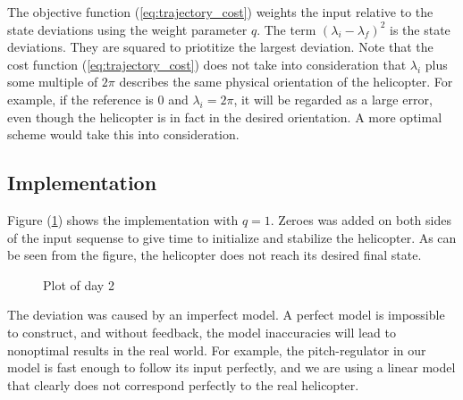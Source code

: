 The objective function (\ref{eq:trajectory_cost}) weights%
 the input relative to the state deviations using the weight parameter $q$. The term $(\lambda_i - \lambda_f)^2$ is the state deviations. They are squared to priotitize the largest deviation. Note that the cost function (\ref{eq:trajectory_cost}) does not take into consideration that $\lambda_i$ plus some multiple of $2\pi$ describes the same physical orientation of the helicopter. For example, if the reference is $0$ and $\lambda_i = 2\pi$, it will be regarded as a large error, even though the helicopter is in fact in the desired orientation. A more optimal scheme would take this into consideration.


\subsection{Implementation}

Figure (\ref{fig:day2_plot}) shows the implementation with $q = 1$. Zeroes was added on both sides of the input sequense to give time to initialize and stabilize the helicopter. As can be seen from the figure, the helicopter does not reach its desired final state. 

\begin{figure}[htb]
	\centering
	\caption{Plot of day 2}
	\label{fig:day2_plot}
\end{figure}

The deviation was caused by an imperfect model. A perfect model is impossible to construct, and without feedback, the model inaccuracies will lead to nonoptimal results in the real world. For example, the pitch-regulator in our model is fast enough to follow its input perfectly, and we are using a linear model that clearly does not correspond perfectly to the real helicopter.